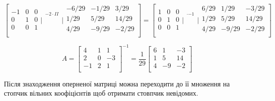 $$
\left[
\begin{array}{rrr}
-1 & 0 & 0 \\
  0 & 1 &  0 \\
  0 & 0 & 1 \\
\end{array} \Bigg|
\begin{array}{ccc}
  _{-2\cdot{II}} \\
  _{} \\
  _{} \\
\end{array}
\Bigg| \begin{array}{rrr}
  -6/29 & -1/29 & 3/29 \\
  1/29 & 5/29 & 14/29 \\
  4/29 & -9/29 & -2/29 \\
\end{array} \right] = \left[
\begin{array}{rrr}
 1 & 0 & 0 \\
  0 & 1 &  0 \\
  0 & 0 & 1 \\
\end{array} \Bigg|
\begin{array}{ccc}
  _{\cdot{-1}} \\
  _{} \\
  _{} \\
\end{array}
\Bigg| \begin{array}{rrr}
  6/29 & 1/29 & -3/29 \\
  1/29 & 5/29 & 14/29 \\
  4/29 & -9/29 & -2/29 \\
\end{array} \right]
$$

$$
A = \begin{bmatrix}
  4 & 1 &  1 \\
  2 & 0 & -3 \\
 -1 & 2 &  1 \\
\end{bmatrix}^{-1} = \dfrac{1}{29}  \begin{bmatrix}
  6 & 1 & -3 \\
  1 & 5 & 14 \\
  4 & -9 & -2 \\
\end{bmatrix}
$$

Після знаходження оперненої матриці можна переходити до її множення на стопчик вільних коофіцієнтів щоб отримати стовпчик невідомих.

